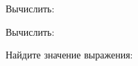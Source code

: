 \begin{listofex}
	\item Вычислить:
	\begin{enumcols}[itemcolumns=3]
		\item {}
		\item {}
		\item {}
		\item {}
		\item {}
		\item {}
	\end{enumcols}
	\item Вычислить:
	\begin{enumcols}[itemcolumns=2]
		\item {}
		\item {}
	\end{enumcols}
	\item Найдите значение выражения:
	\begin{enumcols}[itemcolumns=2]
		\item {}
		\item {}
		\item {}
	\end{enumcols}
	\item {}
	\item {}
	\item {}
	\item {}
	\item {}
\end{listofex}